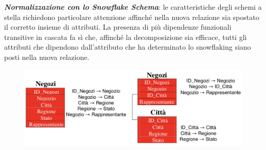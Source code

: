 \documentclass[a4paper, notitlepage, 9pt]{extreport}
\begin{document}
\begin{multicols}{2}
	\noindent
	\textit{\textbf{Normalizzazione con lo Snowflake Schema}}: le caratteristiche degli schemi a stella richiedono particolare attenzione affinché nella nuova relazione sia spostato il corretto insieme di attributi. La presenza di più dipendenze funzionali transitive in cascata fa sì che, affinché la decomposizione sia efficace, tutti gli attributi che dipendono dall’attributo che ha determinato lo snowflaking siano posti nella nuova relazione.
	\columnbreak
	\begin{figure}[H]
		\centering
		\includegraphics[scale=0.38]{Normalizzazione}
	\end{figure}
\end{multicols}
\end{document}

